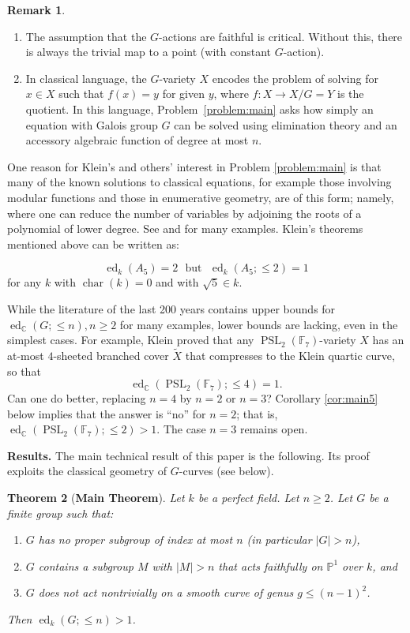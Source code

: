 \documentclass[11pt]{amsart}
\newtheorem{theorem}{Theorem}[section]
\theoremstyle{definition}
\newtheorem{remark}[theorem]{Remark}
\numberwithin{equation}{section}
\newcommand{\Cb}{\mathbb{C}}
\newcommand{\Fb}{\mathbb{F}}
\newcommand{\F}{\mathbb{F}}
\newcommand{\Pb}{\mathbb{P}}
\DeclareMathOperator{\PSL}{PSL}
\DeclareMathOperator{\ed}{ed}
\DeclareMathOperator{\characteristic}{char}
\newcommand{\para}[1]{\medskip\noindent\textbf{#1.}}
\begin{document}
\begin{remark}\mbox{}
	\begin{enumerate}
		\item The assumption that the $G$-actions are faithful is critical.  Without this, there is always the trivial map to a point (with constant $G$-action). 
		\item In classical language, the $G$-variety $X$ encodes the problem of solving for $x\in X$ such that $f(x)=y$ for given $y$, where $f\colon X\to X/G=Y$ is the quotient.  In this language, 		Problem~\ref{problem:main}  asks how simply an equation with Galois group $G$ can be solved using elimination theory and an accessory algebraic function of degree at most $n$. 
	\end{enumerate}
\end{remark}

One reason for Klein's and others' interest in Problem \ref{problem:main} 
is that many of the known solutions to classical equations, for example those involving modular functions and those in enumerative geometry,  are of this form; namely, where one can reduce the number of variables by adjoining the roots of a polynomial of lower degree.  See \cite{FW} and \cite{FKW2} for many examples.    Klein's theorems mentioned above can be written as:

\[\ed_k(A_5)=2\ \ \ \text{but}\ \ \ \ed_k(A_5;\le 2)=1\]
for any $k$ with $\characteristic(k)=0$ and with $\sqrt{5}\in k$. 

\vspace{.2cm}
While the literature of the last 200 years contains upper bounds for 
$\ed_{\Cb}(G;\leq n), n\geq 2$ for many examples, lower bounds are lacking, even in the simplest cases.   For example, Klein proved that any $\PSL_2(\Fb_7)$-variety $X$ has an at-most $4$-sheeted branched cover $\widetilde{X}$ that compresses to the Klein quartic curve, so that
\[ \ed_{\Cb}(\PSL_2(\F_7);\leq 4)=1.\]
Can one do better, replacing $n=4$ by $n=2$ or $n=3$? Corollary \ref{cor:main5} below implies that the answer is ``no'' for $n=2$; that is, $\ed_{\Cb}(\PSL_2(\F_7);\leq 2)>1$.  The case $n=3$ remains open.

\para{Results}  
The main technical result of this paper is the following. Its proof exploits the classical geometry of $G$-curves (see below).

\begin{theorem}[{\bf Main Theorem}]\label{t:main}
	Let $k$ be a perfect field. Let $n\ge 2$. Let $G$ be a finite group such that:
    \begin{enumerate}
        \item $G$ has no proper subgroup of index at most $n$ (in particular $|G|>n$), 
        \item $G$ contains a subgroup $M$ with $|M|>n$ that acts faithfully on $\Pb^1$ over $k$, and
        \item\label{a:cast} $G$ does not act nontrivially on a smooth curve of genus $g\le (n-1)^2$.
    \end{enumerate}
    Then $\ed_k(G;\le n)>1$.
\end{theorem}
\end{document}
